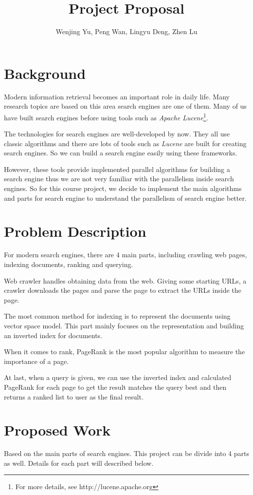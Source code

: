 \documentclass[11pt]{amsart}
\title{Project Proposal}
\author{Wenjing Yu, Peng Wan, Lingyu Deng, Zhen Lu}
\begin{document}
\maketitle
\section{Background}
Modern information retrieval becomes an important role in daily life. Many research topics
are based on this area search engines are one of them. Many of us have built search engines 
before using tools such as \emph{Apache Lucene}\footnote{For more details, see 
http://lucene.apache.org}. 

The technologies for search engines are well-developed by now. They all use classic algorithms and
there are lots of tools such as \emph{Lucene} are built for creating search engines. So we can
build a search engine easily using these frameworks.

However, these tools provide implemented parallel algorithms for building a search engine thus we are
not very familiar with the parallelism inside search engines. So for this course project, we 
decide to implement the main algorithms and parts for search engine to understand the parallelism 
of search engine better.

\section{Problem Description}
For modern search engines, there are 4 main parts, including crawling web pages, indexing documents, 
ranking and querying. 

Web crawler handles obtaining data from the web. Giving some starting URLs, a crawler downloads the
pages and parse the page to extract the URLs inside the page. 

The most common method for indexing is to represent the documents using vector space model. This part
mainly focuses on the representation and building an inverted index for documents.

When it comes to rank, PageRank is the most popular algorithm to measure the importance of a page. 

At last, when a query is given, we can use the inverted index and calculated PageRank for each page
to get the result matches the query best and then returns a ranked list to user as the final result.

\section{Proposed Work}
Based on the main parts of search engines. This project can be divide into 4 parts as well. Details
for each part will described below.
\end{document}
